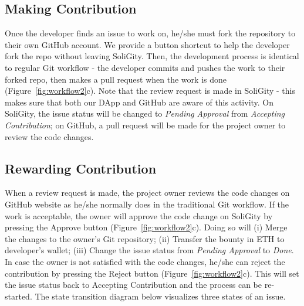 \documentclass[12pt]{article}
\renewcommand{\_}{\kern-1.5pt\textunderscore\kern-1.5pt}
\begin{document}
\subsection{Making Contribution}

Once the developer finds an issue to work on, he/she must fork the repository to their own GitHub account. We provide a button shortcut to help the developer fork the repo without leaving SoliGity. Then, the development process is identical to regular Git workflow - the developer commits and pushes the work to their forked repo, then makes a pull request when the work is done (Figure~\ref{fig:workflow2}c). Note that the review request is made in SoliGity - this makes sure that both our DApp and GitHub are aware of this activity. On SoliGity, the issue status will be changed to \textit{Pending Approval} from \textit{Accepting Contribution}; on GitHub, a pull request will be made for the project owner to review the code changes.

\subsection{Rewarding Contribution}
When a review request is made, the project owner reviews the code changes on GitHub website as he/she normally does in the traditional Git workflow. If the work is acceptable, the owner will approve the code change on SoliGity by pressing the Approve button (Figure~\ref{fig:workflow2}c). Doing so will (i) Merge the changes to the owner’s Git repository;
(ii) Transfer the bounty in ETH to developer’s wallet;
(iii) Change the issue status from \textit{Pending Approval} to \textit{Done}. In case the owner is not satisfied with the code changes, he/she can reject the contribution by pressing the Reject button (Figure~\ref{fig:workflow2}c). This will set the issue status back to Accepting Contribution and the process can be re-started. The state transition diagram below visualizes three states of an issue.\\

   \begin{center}
   \scriptsize
    \end{center}
\end{document}
